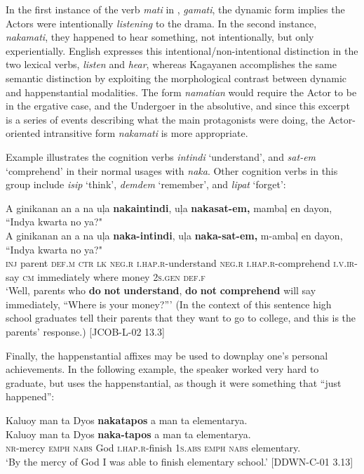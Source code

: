 In the first instance of the verb \textit{mati} in , \textit{gamati}, the dynamic form implies the Actors were intentionally \textit{listening} to the drama. In the second instance, \textit{nakamati}, they happened to hear something, not intentionally, but only experientially. English expresses this intentional/non-intentional distinction in the two lexical verbs, \textit{listen} and \textit{hear}, whereas Kagayanen accomplishes the same semantic distinction by exploiting the morphological contrast between dynamic and happenstantial modalities. The form \textit{namatian} would require the Actor to be in the ergative case, and the Undergoer in the absolutive, and since this excerpt is a series of events describing what the main protagonists were doing, the Actor-oriented intransitive form \textit{nakamati} is more appropriate.

Example  illustrates the cognition verbs \textit{intindi} ‘understand’, and \textit{sat-em} ‘comprehend’ in their normal usages with \textit{naka}. Other cognition verbs in this group include \textit{isip} ‘think’, \textit{demdem} ‘remember’, and \textit{lipat} ‘forget’:

\ea
\label{bkm:Ref448405038}
A  ginikanan  an  a  na  uļa  \textbf{nakaintindi},  uļa  \textbf{nakasat-em,} mambaļ  en  dayon,  “Indya  kwarta  no  ya?" \\\smallskip
 \gll A  ginikanan  an  a  na  uļa  \textbf{naka-intindi},  uļa  \textbf{naka-sat-em,} m-ambaļ  en  dayon,  “Indya  kwarta  no  ya?" \\
\textsc{inj}  parent  \textsc{def.m}  \textsc{ctr}  \textsc{lk}  \textsc{neg.r}  \textsc{i.hap.r}-understand  \textsc{neg.r}  \textsc{i.hap.r}-comprehend
\textsc{i.v.ir}-say  \textsc{cm}  immediately  where  money  2\textsc{s.gen}  \textsc{def.f} \\
\glt `Well, parents who \textbf{do} \textbf{not} \textbf{understand}, \textbf{do} \textbf{not} \textbf{comprehend} will say immediately, “Where is your money?”' (In the context of this sentence high school graduates tell their parents that they want to go to college, and this is the parents’ response.) [JCOB-L-02 13.3]
\z

Finally, the happenstantial affixes may be used to downplay one’s personal achievements. In the following example, the speaker worked very hard to graduate, but uses the happenstantial, as though it were something that “just happened”:

\ea
Kaluoy  man  ta  Dyos  \textbf{nakatapos}  a  man  ta  elementarya. \\\smallskip
 \gll Kaluoy  man  ta  Dyos  \textbf{naka-tapos}  a  man  ta  elementarya. \\
\textsc{nr}-mercy  \textsc{emph}  \textsc{nabs}  God  \textsc{i.hap.r}-finish  1\textsc{s.abs}  \textsc{emph}  \textsc{nabs}  elementary. \\
\glt ‘By the mercy of God I was able to finish elementary school.’ [DDWN-C-01 3.13]
\z

